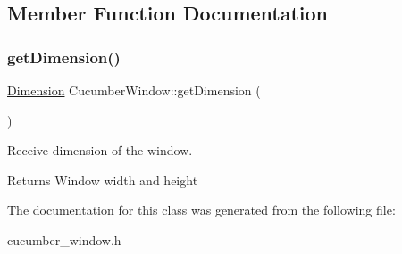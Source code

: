\subsection{Member Function Documentation}
\hypertarget{classCucumberWindow_a0d2e984baf026307ec0691b69bb599d5}{}\label{classCucumberWindow_a0d2e984baf026307ec0691b69bb599d5} 
\subsubsection{\texorpdfstring{get\+Dimension()}{getDimension()}}
{\footnotesize\ttfamily \hyperlink{classDimension}{Dimension} Cucumber\+Window\+::get\+Dimension (\begin{DoxyParamCaption}{ }\end{DoxyParamCaption})}



Receive dimension of the window. 

\begin{DoxyReturn}{Returns}
Window width and height 
\end{DoxyReturn}


The documentation for this class was generated from the following file\+:\begin{DoxyCompactItemize}
\item 
cucumber\+\_\+window.\+h\end{DoxyCompactItemize}
